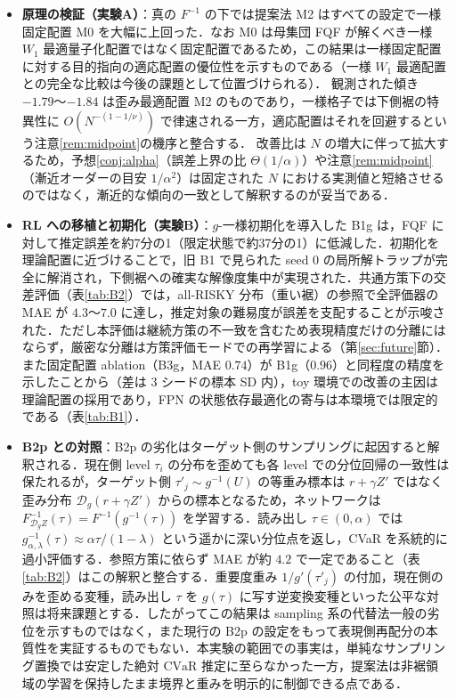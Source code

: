 \documentclass[a4paper,10pt]{jsarticle}
\theoremstyle{definition}
\newcommand{\CVaR}{\mathrm{CVaR}}
\newcommand{\Finv}{F^{-1}}
\newcommand{\dist}{\mathcal{D}_g}
\begin{document}
\begin{itemize}
  \item \textbf{原理の検証（実験A）}：真の $\Finv$ の下では提案法 M2 はすべての設定で一様固定配置 M0 を大幅に上回った．なお M0 は母集団 FQF が解くべき一様 $W_1$ 最適量子化配置ではなく固定配置であるため，この結果は一様固定配置に対する目的指向の適応配置の優位性を示すものである（一様 $W_1$ 最適配置との完全な比較は今後の課題として位置づけられる）．
  観測された傾き $-1.79$〜$-1.84$ は歪み最適配置 M2 のものであり，一様格子では下側裾の特異性に $O(N^{-(1-1/\nu)})$ で律速される一方，適応配置はそれを回避するという注意\ref{rem:midpoint}の機序と整合する．
  改善比は $N$ の増大に伴って拡大するため，予想\ref{conj:alpha}（誤差上界の比 $\Theta(1/\alpha)$）や注意\ref{rem:midpoint}（漸近オーダーの目安 $1/\alpha^2$）は固定された $N$ における実測値と短絡させるのではなく，漸近的な傾向の一致として解釈するのが妥当である．
  \item \textbf{RL への移植と初期化（実験B）}：$g$-一様初期化を導入した B1g は，FQF に対して推定誤差を約7分の1（限定状態で約37分の1）に低減した．初期化を理論配置に近づけることで，旧 B1 で見られた seed 0 の局所解トラップが完全に解消され，下側裾への確実な解像度集中が実現された．共通方策下の交差評価（表\ref{tab:B2}）では，all-RISKY 分布（重い裾）の参照で全評価器の MAE が $4.3$〜$7.0$ に達し，推定対象の難易度が誤差を支配することが示唆された．ただし本評価は継続方策の不一致を含むため表現精度だけの分離にはならず，厳密な分離は方策評価モードでの再学習による（第\ref{sec:future}節）．また固定配置 ablation（B3g，MAE $0.74$）が B1g（$0.96$）と同程度の精度を示したことから（差は 3 シードの標本 SD 内），toy 環境での改善の主因は理論配置の採用であり，FPN の状態依存最適化の寄与は本環境では限定的である（表\ref{tab:B1}）．
  \item \textbf{B2p との対照}：B2p の劣化はターゲット側のサンプリングに起因すると解釈される．現在側 level $\tau_i$ の分布を歪めても各 level での分位回帰の一致性は保たれるが，ターゲット側 $\tau'_j\sim g^{-1}(U)$ の等重み標本は $r+\gamma Z'$ ではなく歪み分布 $\dist(r+\gamma Z')$ からの標本となるため，ネットワークは $F^{-1}_{\dist Z}(\tau)=\Finv(g^{-1}(\tau))$ を学習する．読み出し $\tau\in(0,\alpha)$ では $g^{-1}_{\alpha,\lambda}(\tau)\approx\alpha\tau/(1-\lambda)$ という遥かに深い分位点を返し，CVaR を系統的に過小評価する．参照方策に依らず MAE が約 $4.2$ で一定であること（表\ref{tab:B2}）はこの解釈と整合する．重要度重み $1/g'(\tau'_j)$ の付加，現在側のみを歪める変種，読み出し $\tau$ を $g(\tau)$ に写す逆変換変種といった公平な対照は将来課題とする．したがってこの結果は sampling 系の代替法一般の劣位を示すものではなく，また現行の B2p の設定をもって表現側再配分の本質性を実証するものでもない．本実験の範囲での事実は，単純なサンプリング置換では安定した絶対 $\CVaR$ 推定に至らなかった一方，提案法は非裾領域の学習を保持したまま境界と重みを明示的に制御できる点である．

\end{itemize}
\end{document}
